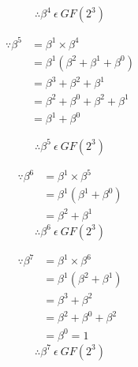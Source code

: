 \documentclass[paper=usletter, fontsize=12pt]{article}
\begin{document}
        \[ \therefore \beta^{4} \ \epsilon \ GF(2^{3}) \]

        \begin{equation*}
            \begin{split}
                \because \beta^{5} & = \beta^{1} \times \beta^{4} \\
                & = \beta^{1} (\beta^{2}+\beta^{1}+\beta^{0}) \\
                & = \beta^{3}+\beta^{2}+\beta^{1} \\
                & = \beta^{2}+\beta^{0}+\beta^{2}+\beta^{1} \\
                & = \beta^{1}+\beta^{0}
            \end{split}
        \end{equation*}

        \[ \therefore \beta^{5} \ \epsilon \ GF(2^{3}) \]

        \begin{equation*}
            \begin{split}
                \because \beta^{6} & = \beta^{1} \times \beta^{5} \\
                & = \beta^{1} (\beta^{1}+\beta^{0}) \\
                & = \beta^{2}+\beta^{1}
            \end{split}
        \end{equation*}
        \[ \therefore \beta^{6} \ \epsilon \ GF(2^{3}) \]

        \begin{equation*}
            \begin{split}
                \because \beta^{7} & = \beta^{1} \times \beta^{6} \\
                & = \beta^{1} (\beta^{2}+\beta^{1}) \\
                & = \beta^{3}+\beta^{2} \\
                & = \beta^{2}+\beta^{0}+\beta^{2} \\
                & = \beta^{0} = 1
            \end{split}
        \end{equation*}
        \[ \therefore \beta^{7} \ \epsilon \ GF(2^{3}) \]
\end{document}
